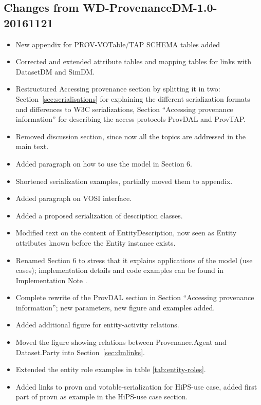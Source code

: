 \documentclass[11pt,a4paper]{ivoa}
\begin{document}
\begin{appendices}
\subsection{Changes from WD-ProvenanceDM-1.0-20161121}
\begin{itemize}
\item New appendix for PROV-VOTable/TAP SCHEMA tables added
\item Corrected and extended attribute tables and mapping tables for links with DatasetDM and SimDM.
\item Restructured Accessing provenance section by splitting it in two: Section~\ref{sec:serialisations} for explaining the different serialization formats and differences to W3C serializations, Section ``Accessing provenance information''%
for describing the access protocols ProvDAL and ProvTAP.
\item Removed discussion section, since now all the topics are addressed in the main text.
\item Added paragraph on how to use the model in Section 6. %
\item Shortened serialization examples, partially moved them to appendix.
\item Added paragraph on VOSI interface.
\item Added a proposed serialization of description classes.
\item Modified text on the content of EntityDescription, now seen as Entity attributes known before the Entity instance exists.
\item Renamed Section 6
to stress that it explains applications of the model (use cases); implementation details and code examples can be found in Implementation Note \citep{std:ProvenanceImplementationNote}.
\item Complete rewrite of the ProvDAL section in Section ``Accessing provenance information'';%
new parameters, new figure and examples added.
\item Added additional figure for entity-activity relations.
\item Moved the figure showing relations between Provenance.Agent and Dataset.Party into Section~\ref{sec:dmlinks}.
\item Extended the entity role examples in table \ref{tab:entity-roles}.
\item Added links to provn and votable-serialization for HiPS-use case, added first part of provn as example in the HiPS-use case section.

\end{itemize}
\end{appendices}
\end{document}
